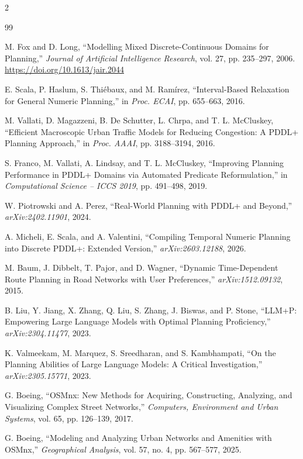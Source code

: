 \documentclass[10pt]{article}
\begin{document}
\begin{multicols}{2}
\begin{thebibliography}{99}\scriptsize

M. Fox and D. Long, ``Modelling Mixed Discrete-Continuous Domains for
Planning,'' \emph{Journal of Artificial Intelligence Research}, vol. 27,
pp. 235--297, 2006. \url{https://doi.org/10.1613/jair.2044}

E. Scala, P. Haslum, S. Thi\'ebaux, and M. Ram\'irez, ``Interval-Based
Relaxation for General Numeric Planning,'' in \emph{Proc. ECAI}, pp. 655--663,
2016.

M. Vallati, D. Magazzeni, B. De Schutter, L. Chrpa, and T. L. McCluskey,
``Efficient Macroscopic Urban Traffic Models for Reducing Congestion: A PDDL+
Planning Approach,'' in \emph{Proc. AAAI}, pp. 3188--3194, 2016.

S. Franco, M. Vallati, A. Lindsay, and T. L. McCluskey, ``Improving Planning
Performance in PDDL+ Domains via Automated Predicate Reformulation,'' in
\emph{Computational Science -- ICCS 2019}, pp. 491--498, 2019.

W. Piotrowski and A. Perez, ``Real-World Planning with PDDL+ and Beyond,''
\emph{arXiv:2402.11901}, 2024.

A. Micheli, E. Scala, and A. Valentini, ``Compiling Temporal Numeric Planning
into Discrete PDDL+: Extended Version,'' \emph{arXiv:2603.12188}, 2026.

M. Baum, J. Dibbelt, T. Pajor, and D. Wagner, ``Dynamic Time-Dependent Route
Planning in Road Networks with User Preferences,'' \emph{arXiv:1512.09132},
2015.

B. Liu, Y. Jiang, X. Zhang, Q. Liu, S. Zhang, J. Biswas, and P. Stone,
``LLM+P: Empowering Large Language Models with Optimal Planning Proficiency,''
\emph{arXiv:2304.11477}, 2023.

K. Valmeekam, M. Marquez, S. Sreedharan, and S. Kambhampati, ``On the
Planning Abilities of Large Language Models: A Critical Investigation,''
\emph{arXiv:2305.15771}, 2023.

G. Boeing, ``OSMnx: New Methods for Acquiring, Constructing, Analyzing, and
Visualizing Complex Street Networks,'' \emph{Computers, Environment and Urban
Systems}, vol. 65, pp. 126--139, 2017.

G. Boeing, ``Modeling and Analyzing Urban Networks and Amenities with OSMnx,''
\emph{Geographical Analysis}, vol. 57, no. 4, pp. 567--577, 2025.


\end{thebibliography}
\end{multicols}
\end{document}
